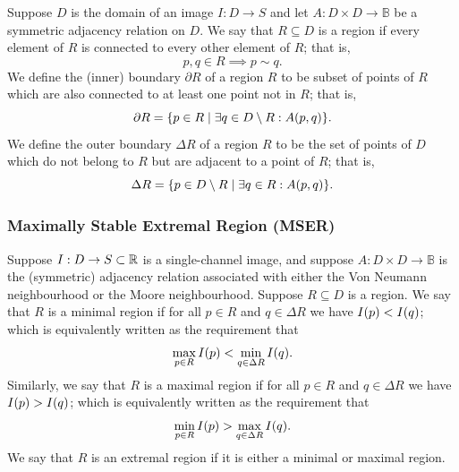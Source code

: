 \documentclass{article}
\begin{document}
Suppose $D$ is the domain of an image $I : D \to S$ and let
$A : D \times D \to \mathbb{B}$ be a symmetric adjacency relation on $D$.
We say that $R \subseteq D$ is a region if every element of $R$ is connected to
every other element of $R$; that is,
\begin{equation}
  \label{eq:def-region}
  p, q \in R
  \implies
  p \sim q
  .
\end{equation}
We define the (inner) boundary $\partial R$ of a region $R$ to be subset of
points of $R$ which are also connected to at least one point not in $R$; that
is,
\begin{equation}
  \label{eq:def-region-boundary-inner}
  \partial R
  =
  \lbrace
    p \in R
    \mid
    \exists q \in D \setminus R
    :
    A(p, q)
  \rbrace
  .
\end{equation}
We define the outer boundary $\Delta R$ of a region $R$ to be the set of points
of $D$ which do not belong to $R$ but are adjacent to a point of $R$; that is,
\begin{equation}
  \label{eq:def-region-boundary-outer}
  \Delta R
  =
  \lbrace
    p \in D \setminus R
    \mid
    \exists q \in R
    :
    A(p, q)
  \rbrace
  .
\end{equation}

\subsubsection*{Maximally Stable Extremal Region (MSER)}

Suppose $I : D \to S \subset \mathbb{R}$ is a single-channel image, and suppose
$A : D \times D \to \mathbb{B}$ is the (symmetric) adjacency relation associated
with either the Von Neumann neighbourhood or the Moore neighbourhood.
Suppose $R \subseteq D$ is a region.
We say that $R$ is a minimal region if for all $p \in R$ and $q \in \Delta R$ we
have $I(p) < I(q)$; which is equivalently written as the requirement that
\begin{equation}
  \label{eq:def-region-minimal}
  \max_{p \in R} I(p)
  <
  \min_{q \in \Delta R} I(q)
  .
\end{equation}
Similarly, we say that $R$ is a maximal region if for all $p \in R$ and
$q \in \Delta R$ we have $I(p) > I(q)$; which is equivalently written as
the requirement that
\begin{equation}
  \label{eq:def-region-minimal}
  \min_{p \in R} I(p)
  >
  \max_{q \in \Delta R} I(q)
  .
\end{equation}
We say that $R$ is an extremal region if it is either a minimal or maximal
region.
\end{document}
